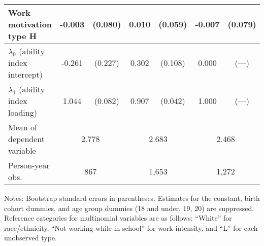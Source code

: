 \begin{table}[ht]
\begin{threeparttable}
\begin{tabular}{lcccccc}
Work motivation type H & -0.003 & (0.080) & 0.010 & (0.059) & -0.007 & (0.079) \\ 
\midrule
$\lambda_{0}$ (ability index intercept) & -0.261 & (0.227) & 0.302 & (0.108) & 0.000 & (---) \\ 
$\lambda_{1}$ (ability index loading) & 1.044 & (0.082) & 0.907 & (0.042) & 1.000 & (---) \\ 
\midrule
Mean of dependent variable & \multicolumn{2}{c}{ 2.778 } & \multicolumn{2}{c}{ 2.683 } & \multicolumn{2}{c}{ 2.468 } \\ 
Person-year obs.  & \multicolumn{2}{c}{  867 } & \multicolumn{2}{c}{ 1,653 } & \multicolumn{2}{c}{ 1,272 }\\
\bottomrule
\end{tabular}
\footnotesize Notes: Bootstrap standard errors in parentheses. Estimates for the constant, birth cohort dummies, and age group dummies (18 and under, 19, 20) are suppressed. Reference categories for multinomial variables are as follows: ``White'' for race/ethnicity, ``Not working while in school'' for work intensity, and ``L'' for each unobserved type.
\end{threeparttable}
\end{table}
